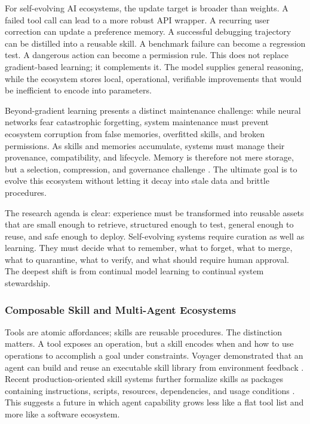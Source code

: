 For self-evolving AI ecosystems, the update target is broader than weights. A failed tool call can lead to a more robust API wrapper. A recurring user correction can update a preference memory. A successful debugging trajectory can be distilled into a reusable skill. A benchmark failure can become a regression test. A dangerous action can become a permission rule. This does not replace gradient-based learning; it complements it. The model supplies general reasoning, while the ecosystem stores local, operational, verifiable improvements that would be inefficient to encode into parameters.

Beyond-gradient learning presents a distinct maintenance challenge: while neural networks fear catastrophic forgetting, system maintenance must prevent ecosystem corruption from false memories, overfitted skills, and broken permissions. As skills and memories accumulate, systems must manage their provenance, compatibility, and lifecycle. Memory is therefore not mere storage, but a selection, compression, and governance challenge \citep{zhang2025survey,pink2025position,chhikara2025mem0,zhou2025mem1,yan2025memory}. The ultimate goal is to evolve this ecosystem without letting it decay into stale data and brittle procedures.

The research agenda is clear: experience must be transformed into reusable assets that are small enough to retrieve, structured enough to test, general enough to reuse, and safe enough to deploy. Self-evolving systems require curation as well as learning. They must decide what to remember, what to forget, what to merge, what to quarantine, what to verify, and what should require human approval. The deepest shift is from continual model learning to continual system stewardship.

\subsubsection{Composable Skill and Multi-Agent Ecosystems}

Tools are atomic affordances; skills are reusable procedures. The distinction matters. A tool exposes an operation, but a skill encodes when and how to use operations to accomplish a goal under constraints. Voyager demonstrated that an agent can build and reuse an executable skill library from environment feedback \citep{wang2023voyager}. Recent production-oriented skill systems further formalize skills as packages containing instructions, scripts, resources, dependencies, and usage conditions \citep{anthropic2026skillsdocs,anthropic2026skillsrepo,ling2026agentskills}. This suggests a future in which agent capability grows less like a flat tool list and more like a software ecosystem.

